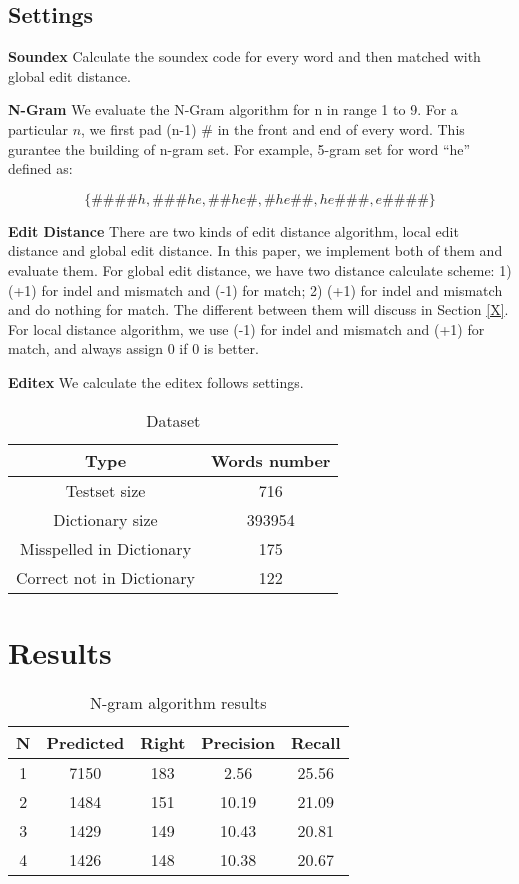 \documentclass[11pt]{article}
\begin{document}
\subsection{Settings} 

\noindent\textbf{Soundex} Calculate the soundex code for every word and then matched with global edit distance.

\noindent\textbf{N-Gram} We evaluate the N-Gram algorithm for n in range 1 to 9. For a particular $n$, we first pad (n-1) \# in the front and end of every word. This gurantee the building of n-gram set. For example, 5-gram set for word ``he'' defined as: 

\begin{equation}
\{\#\#\#\#h, \#\#\#he, \#\#he\#, \#he\#\#, he\#\#\#, e\#\#\#\#\}
\end{equation}

\noindent\textbf{Edit Distance} There are two kinds of edit distance algorithm, local edit distance and global edit distance. In this paper,  we implement both of them and evaluate them. For global edit distance, we have two distance calculate scheme: 1) (+1) for indel and mismatch and (-1) for match; 2) (+1) for indel and mismatch and do nothing for match. The different between them will discuss in Section \ref{X}. For local distance algorithm, we use (-1) for indel and mismatch and (+1) for match, and always assign 0 if 0 is better.

\noindent\textbf{Editex} We calculate the editex follows \cite{} settings.

\begin{table}
	\centering
	\begin{tabular}{c|c}
		\hline
		\textbf{Type} & \textbf{Words number} \\
		\hline
		Testset size & 716 \\
		\hline
		Dictionary  size & 393954 \\
		\hline
		Misspelled in Dictionary & 175 \\
		\hline
		Correct not in Dictionary & 122 \\
		\hline
	\end{tabular}
	\caption{Dataset}
	\label{tab:dataset}
\end{table}

 
\section{Results}

\begin{table}
	\centering
	\begin{tabular}{c|c|c|c|c}
		\hline
		N &Predicted & Right & Precision & Recall \\
		\hline
		 1 & 7150 & 183 & 2.56 & 25.56 \\
		\hline
		 2 & 1484 & 151 & 10.19 & 21.09  \\
		\hline
		 3 & 1429 & 149 & 10.43 & 20.81 \\
		\hline
		 4 & 1426 & 148 & 10.38 & 20.67 \\
		\hline
	\end{tabular}
	\caption{N-gram algorithm results}
	\label{tab:ngram}
\end{table}
\end{document}
